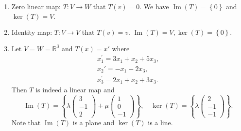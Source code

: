 \documentclass[10pt]{article}
\DeclareMathOperator{\im}{Im}
\begin{document}
    \begin{example}
        \begin{enumerate}[(1)]
            \item Zero linear map: $ T:V\to W $ that $ T(v)=0 $. We have $ \im(T)=\left\{ 0\right\} $ and $ \ker(T)=V $.
            \item Identity map: $ T:V\to V $ that $ T(v)=v $. $ \im(T)=V, \ker(T)=\left\{ 0\right\} $.
            \item Let $ V=W=\mathbb{R}^3 $ and $ T(x)=x' $ where 
            \[
                \begin{array}{l}
                    x_{1}^{\prime}=3 x_{1}+x_{2}+5 x_{3}, \\
                    x_{2}'=-x_{1}-2 x_{3}, \\
                    x_{3}^{\prime}=2 x_{1}+x_{2}+3 x_{3}.
                \end{array}
            \]
            Then $T$ is indeed a linear map and
            \[
                \im(T)=\left\{ \lambda \begin{pmatrix}
                    3\\-1\\2
                \end{pmatrix}+\mu \begin{pmatrix}
                    1\\0\\-1
                \end{pmatrix} \right\},\quad \ker(T)=\left\{ \lambda \begin{pmatrix}
                    2\\-1\\-1
                \end{pmatrix}\right\}
            .\]
            Note that $\im(T)$ is a plane and $\ker(T)$ is a line.
        \end{enumerate}
    \end{example}
\end{document}
